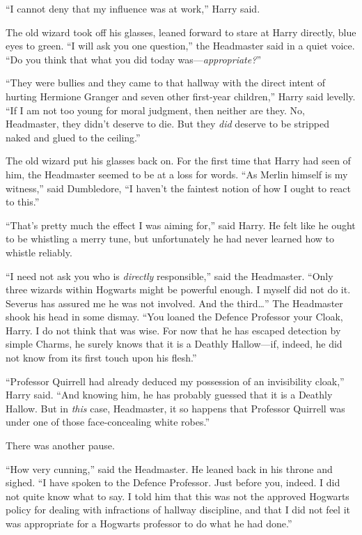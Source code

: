 “I cannot deny that my influence was at work,” Harry said.

The old wizard took off his glasses, leaned forward to stare at Harry directly, blue eyes to green. “I will ask you one question,” the Headmaster said in a quiet voice. “Do you think that what you did today was—\emph{appropriate?}”

“They were bullies and they came to that hallway with the direct intent of hurting Hermione Granger and seven other first-year children,” Harry said levelly. “If I am not too young for moral judgment, then neither are they. No, Headmaster, they didn’t deserve to die. But they \emph{did} deserve to be stripped naked and glued to the ceiling.”

The old wizard put his glasses back on. For the first time that Harry had seen of him, the Headmaster seemed to be at a loss for words. “As Merlin himself is my witness,” said Dumbledore, “I haven’t the faintest notion of how I ought to react to this.”

“That’s pretty much the effect I was aiming for,” said Harry. He felt like he ought to be whistling a merry tune, but unfortunately he had never learned how to whistle reliably.

“I need not ask you who is \emph{directly} responsible,” said the Headmaster. “Only three wizards within Hogwarts might be powerful enough. I myself did not do it. Severus has assured me he was not involved. And the third…” The Headmaster shook his head in some dismay. “You loaned the Defence Professor your Cloak, Harry. I do not think that was wise. For now that he has escaped detection by simple Charms, he surely knows that it is a Deathly Hallow—if, indeed, he did not know from its first touch upon his flesh.”

“Professor Quirrell had already deduced my possession of an invisibility cloak,” Harry said. “And knowing him, he has probably guessed that it is a Deathly Hallow. But in \emph{this} case, Headmaster, it so happens that Professor Quirrell was under one of those face-concealing white robes.”

There was another pause.

“How very cunning,” said the Headmaster. He leaned back in his throne and sighed. “I have spoken to the Defence Professor. Just before you, indeed. I did not quite know what to say. I told him that this was not the approved Hogwarts policy for dealing with infractions of hallway discipline, and that I did not feel it was appropriate for a Hogwarts professor to do what he had done.”

